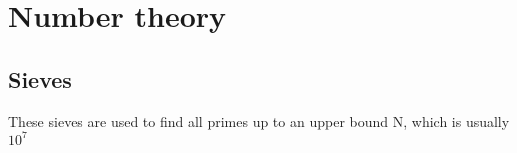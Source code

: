 \chapter{Number theory}

\section{Sieves}

    These sieves are used to find all primes up to an upper bound N, which is usually $10^7$

    
